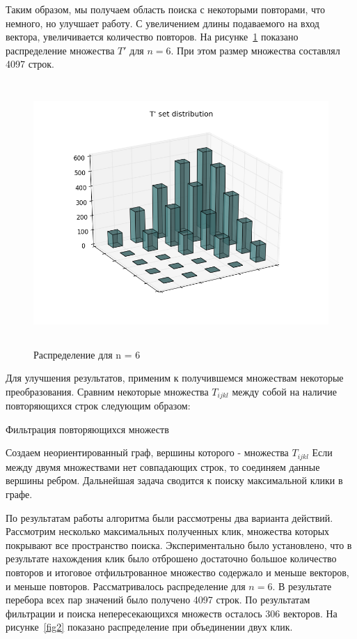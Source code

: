 Таким образом, мы получаем область поиска с некоторыми повторами, что немного, но улучшает работу. С увеличением длины подаваемого на вход вектора, увеличивается количество повторов.
На рисунке~\ref{fig1} показано распределение множества $T'$ для $n = 6$. При этом размер множества составлял 4097 строк.

\begin{figure}[H]
\centering
\includegraphics[height=10cm]{pic/fig6_n.png}
\caption{Распределение для n = 6}\label{fig1}
\end{figure}

Для улучшения результатов, применим к получившемся множествам некоторые преобразования. Сравним некоторые множества $T_{ijkl}$ между собой на наличие повторяющихся строк следующим образом: 

\begin{algorithm}[H]
\caption{Фильтрация повторяющихся множеств}\label{lst1}
\begin{algorithmic}
        \State Создаем неориентированный граф, вершины которого - множества $T_{ijkl}$ 
    	        \State Если между двумя множествами нет совпадающих строк, то соединяем данные вершины ребром.   
	        \EndFor
	    \EndFor
	    \State Дальнейшая задача сводится к поиску максимальной клики в графе.
\end{algorithmic}
\end{algorithm} 

По результатам работы алгоритма были рассмотрены два варианта действий. 
Рассмотрим несколько максимальных полученных клик, множества которых покрывают все пространство поиска. Экспериментально было установлено, что в результате нахождения клик
было отброшено достаточно большое количество повторов и итоговое отфильтрованное множество содержало и меньше векторов, и меньше повторов. 
Рассматривалось распределение для $n = 6$. В результате перебора всех пар значений было получено 4097 строк. По результатам фильтрации и поиска непересекающихся множеств осталось 306 векторов.
На рисунке~\ref{fig2} показано распределение при объединении двух клик. 

